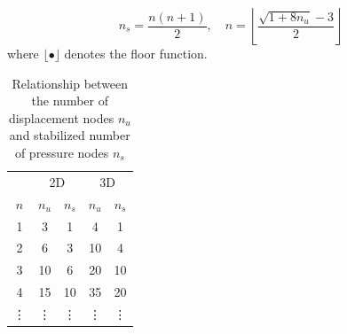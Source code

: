 \begin{equation}
n_s = \frac{n(n + 1)}{2}, \quad
n = \left\lfloor \frac{\sqrt{1 + 8n_u} - 3}{2} \right\rfloor
\end{equation}
where $\lfloor \bullet \rfloor$ denotes the floor function. 

\begin{table}[ht!]
\centering
\caption{Relationship between the number of displacement nodes $n_u$ and stabilized number of pressure nodes $n_s$}
\label{tab:constraint}
\begin{tabular}{ccccc}
\toprule
& \multicolumn{2}{c}{2D} & \multicolumn{2}{c}{3D} \\
$n$ & $n_u$ & $n_s$ & $n_u$ & $n_s$ \\
\midrule
1 & 3 & 1 & 4 & 1 \\
2 & 6 & 3 & 10 & 4 \\
3 & 10 & 6 & 20 & 10 \\
4 & 15 & 10 & 35 & 20 \\
\vdots & \vdots & \vdots & \vdots & \vdots \\
\bottomrule
\end{tabular}
\end{table}

